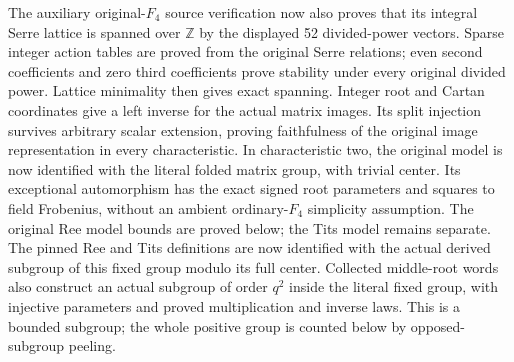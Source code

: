 The auxiliary original-$F_4$ source verification now also proves that its
integral Serre lattice is spanned over $\mathbb Z$ by the displayed 52
divided-power vectors. Sparse integer action tables are proved from the
original Serre relations; even second coefficients and zero third
coefficients prove stability under every original divided power. Lattice
minimality then gives exact spanning. Integer root and Cartan coordinates
give a left inverse for the actual matrix images. Its split injection
survives arbitrary scalar extension, proving faithfulness of the original
image representation in every characteristic. In characteristic two,
the original model is now identified with the literal folded matrix
group, with trivial center. Its exceptional automorphism has the exact
signed root parameters and squares to field Frobenius, without an
ambient ordinary-$F_4$ simplicity assumption. The original Ree model
bounds are proved below; the Tits model remains separate.
The pinned Ree and Tits definitions are now identified with the actual
derived subgroup of this fixed group modulo its full center.
Collected middle-root words also construct an actual subgroup of order
$q^2$ inside the literal fixed group, with injective parameters and
proved multiplication and inverse laws. This is a bounded subgroup;
the whole positive group is counted below by opposed-subgroup peeling.


